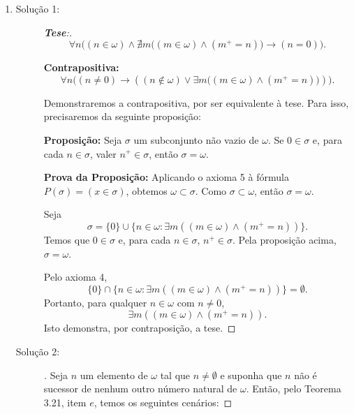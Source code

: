 \begin{enumerate}[label=(\alph{*})]
	\item  
	\begin{description}
		\item[Solução 1:] 
		\begin{proof}[\textbf{Tese}:]
			\[
			\forall n \big((n \in \omega) \wedge \nexists m \big((m \in \omega) \wedge (m^+ = n)\big) \to (n = 0)\big).
			\]
			
			\textbf{Contrapositiva:}  
			\[
			\forall n \big((n \neq 0) \to ((n \notin \omega) \vee \exists m \big((m \in \omega) \wedge (m^+ = n)\big))\big).
			\]
			
			Demonstraremos a contrapositiva, por ser equivalente à tese. Para isso, precisaremos da seguinte proposição:
			
			\vspace{0.3cm}
			\textbf{Proposição:} Seja $\sigma$ um subconjunto não vazio de $\omega$. Se $0 \in \sigma$ e, para cada $n \in \sigma$, valer $n^+ \in \sigma$, então $\sigma = \omega$.
			
			\vspace{0.3cm}
			\textbf{Prova da Proposição:} Aplicando o axioma 5 à fórmula $P(\sigma) = (x \in \sigma)$, obtemos $\omega \subset \sigma$. Como $\sigma \subset \omega$, então $\sigma = \omega$.  
			
			Seja 
			\[
			\sigma = \{0\} \cup \{n \in \omega : \exists m ((m \in \omega) \wedge (m^+ = n))\}.
			\]
			Temos que $0 \in \sigma$ e, para cada $n \in \sigma$, $n^+ \in \sigma$. Pela proposição acima, $\sigma = \omega$.  
			
			Pelo axioma 4, 
			\[
			\{0\} \cap \{n \in \omega : \exists m ((m \in \omega) \wedge (m^+ = n))\} = \emptyset.
			\]
			Portanto, para qualquer $n \in \omega$ com $n \neq 0$,  
			\[
			\exists m ((m \in \omega) \wedge (m^+ = n)).
			\]
			Isto demonstra, por contraposição, a tese.
		\end{proof}
	
		\item[Solução 2:] 
		\begin{proof}[]
			Seja $n$ um elemento de $\omega$ tal que $n \neq \emptyset$ e suponha que $n$ não é sucessor de nenhum outro número natural de $\omega$. Então, pelo Teorema 3.21, item $e$, temos os seguintes cenários:


\end{proof}
\end{description}
\end{enumerate}
